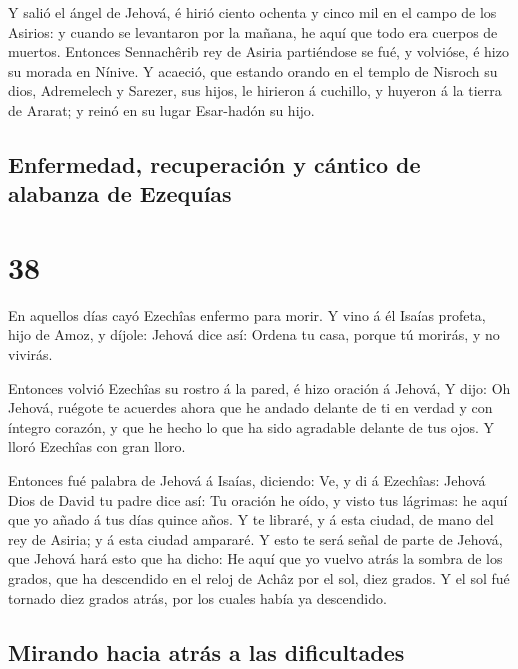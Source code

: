  Y salió el ángel de Jehová, é hirió ciento ochenta y cinco
mil en el campo de los Asirios: y cuando se levantaron por la mañana, he
aquí que todo era cuerpos de muertos.  Entonces Sennachêrib
rey de Asiria partiéndose se fué, y volvióse, é hizo su morada en
Nínive.  Y acaeció, que estando orando en el templo de
Nisroch su dios, Adremelech y Sarezer, sus hijos, le hirieron á
cuchillo, y huyeron á la tierra de Ararat; y reinó en su lugar
Esar-hadón su hijo.

\hypertarget{enfermedad-recuperaciuxf3n-y-cuxe1ntico-de-alabanza-de-ezequuxedas}{%
\subsection{Enfermedad, recuperación y cántico de alabanza de
Ezequías}\label{enfermedad-recuperaciuxf3n-y-cuxe1ntico-de-alabanza-de-ezequuxedas}}

\hypertarget{section-37}{%
\section{38}\label{section-37}}

 En aquellos días cayó Ezechîas enfermo para morir. Y vino á
él Isaías profeta, hijo de Amoz, y díjole: Jehová dice así: Ordena tu
casa, porque tú morirás, y no vivirás.

 Entonces volvió Ezechîas su rostro á la pared, é hizo
oración á Jehová,  Y dijo: Oh Jehová, ruégote te acuerdes
ahora que he andado delante de ti en verdad y con íntegro corazón, y que
he hecho lo que ha sido agradable delante de tus ojos. Y lloró Ezechîas
con gran lloro.

 Entonces fué palabra de Jehová á Isaías, diciendo:
 Ve, y di á Ezechîas: Jehová Dios de David tu padre dice
así: Tu oración he oído, y visto tus lágrimas: he aquí que yo añado á
tus días quince años.  Y te libraré, y á esta ciudad, de
mano del rey de Asiria; y á esta ciudad ampararé.  Y esto te
será señal de parte de Jehová, que Jehová hará esto que ha dicho:
 He aquí que yo vuelvo atrás la sombra de los grados, que ha
descendido en el reloj de Achâz por el sol, diez grados. Y el sol fué
tornado diez grados atrás, por los cuales había ya descendido.

\hypertarget{mirando-hacia-atruxe1s-a-las-dificultades}{%
\subsection{Mirando hacia atrás a las
dificultades}\label{mirando-hacia-atruxe1s-a-las-dificultades}}

